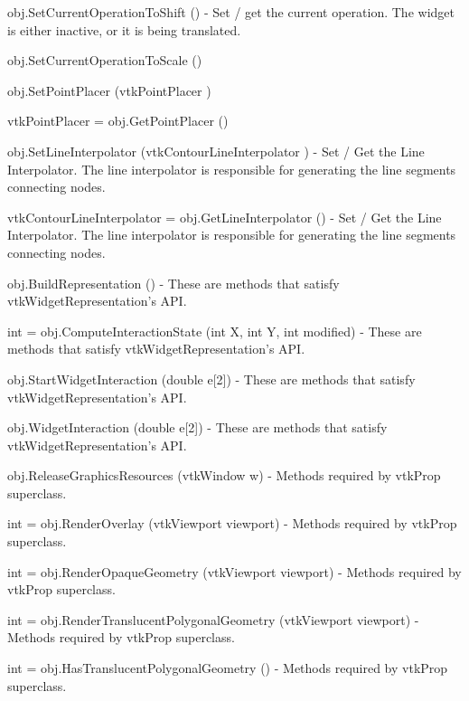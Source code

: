 \begin{DoxyItemize}
\item {\ttfamily obj.\-Set\-Current\-Operation\-To\-Shift ()} -\/ Set / get the current operation. The widget is either inactive, or it is being translated.  
\item {\ttfamily obj.\-Set\-Current\-Operation\-To\-Scale ()}  
\item {\ttfamily obj.\-Set\-Point\-Placer (vtk\-Point\-Placer )}  
\item {\ttfamily vtk\-Point\-Placer = obj.\-Get\-Point\-Placer ()}  
\item {\ttfamily obj.\-Set\-Line\-Interpolator (vtk\-Contour\-Line\-Interpolator )} -\/ Set / Get the Line Interpolator. The line interpolator is responsible for generating the line segments connecting nodes.  
\item {\ttfamily vtk\-Contour\-Line\-Interpolator = obj.\-Get\-Line\-Interpolator ()} -\/ Set / Get the Line Interpolator. The line interpolator is responsible for generating the line segments connecting nodes.  
\item {\ttfamily obj.\-Build\-Representation ()} -\/ These are methods that satisfy vtk\-Widget\-Representation's A\-P\-I.  
\item {\ttfamily int = obj.\-Compute\-Interaction\-State (int X, int Y, int modified)} -\/ These are methods that satisfy vtk\-Widget\-Representation's A\-P\-I.  
\item {\ttfamily obj.\-Start\-Widget\-Interaction (double e\mbox{[}2\mbox{]})} -\/ These are methods that satisfy vtk\-Widget\-Representation's A\-P\-I.  
\item {\ttfamily obj.\-Widget\-Interaction (double e\mbox{[}2\mbox{]})} -\/ These are methods that satisfy vtk\-Widget\-Representation's A\-P\-I.  
\item {\ttfamily obj.\-Release\-Graphics\-Resources (vtk\-Window w)} -\/ Methods required by vtk\-Prop superclass.  
\item {\ttfamily int = obj.\-Render\-Overlay (vtk\-Viewport viewport)} -\/ Methods required by vtk\-Prop superclass.  
\item {\ttfamily int = obj.\-Render\-Opaque\-Geometry (vtk\-Viewport viewport)} -\/ Methods required by vtk\-Prop superclass.  
\item {\ttfamily int = obj.\-Render\-Translucent\-Polygonal\-Geometry (vtk\-Viewport viewport)} -\/ Methods required by vtk\-Prop superclass.  
\item {\ttfamily int = obj.\-Has\-Translucent\-Polygonal\-Geometry ()} -\/ Methods required by vtk\-Prop superclass.  

\end{DoxyItemize}
